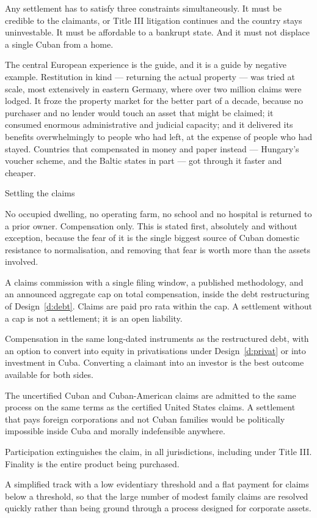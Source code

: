 Any settlement has to satisfy three constraints simultaneously. It must be
credible to the claimants, or Title III litigation continues and the country
stays uninvestable. It must be affordable to a bankrupt state. And it must not
displace a single Cuban from a home.

The central European experience is the guide, and it is a guide by negative
example. Restitution in kind --- returning the actual property --- was tried at
scale, most extensively in eastern Germany, where over two million claims were
lodged. It froze the property market for the better part of a decade, because no
purchaser and no lender would touch an asset that might be claimed; it consumed
enormous administrative and judicial capacity; and it delivered its benefits
overwhelmingly to people who had left, at the expense of people who had stayed.
Countries that compensated in money and paper instead --- Hungary's voucher
scheme, and the Baltic states in part --- got through it faster and cheaper.

\begin{design}{Settling the claims}
\label{d:claims}
\begin{rules}
 No occupied dwelling, no operating farm, no school
and no hospital is returned to a prior owner. Compensation only. This is stated
first, absolutely and without exception, because the fear of it is the single
biggest source of Cuban domestic resistance to normalisation, and removing that
fear is worth more than the assets involved.

 A claims commission with a single filing window, a
published methodology, and an announced aggregate cap on total compensation,
inside the debt restructuring of Design~\ref{d:debt}. Claims are paid pro rata
within the cap. A settlement without a cap is not a settlement; it is an open
liability.

 Compensation in the same long-dated instruments as the
restructured debt, with an option to convert into equity in privatisations under
Design~\ref{d:privat} or into investment in Cuba. Converting a claimant into an
investor is the best outcome available for both sides.

 The uncertified Cuban and Cuban-American claims are
admitted to the same process on the same terms as the certified United States
claims. A settlement that pays foreign corporations and not Cuban families would
be politically impossible inside Cuba and morally indefensible anywhere.

 Participation extinguishes the claim, in all jurisdictions,
including under Title III. Finality is the entire product being purchased.

 A simplified track with a low evidentiary threshold and
a flat payment for claims below a threshold, so that the large number of modest
family claims are resolved quickly rather than being ground through a process
designed for corporate assets.
\end{rules}
\end{design}

